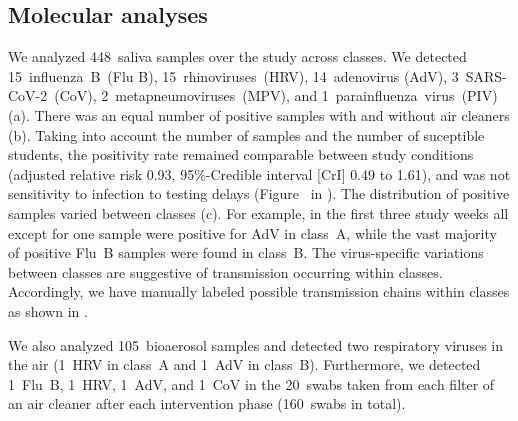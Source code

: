 \documentclass[fleqn,11pt]{wlscirep}
\begin{document}
\subsection{Molecular analyses}

We analyzed 448~saliva samples over the study across classes. We detected 15~influenza~B~(Flu B), 15~rhinoviruses~(HRV), 14~adenovirus (AdV), 3~SARS-CoV-2~(CoV), 2~metapneumoviruses~(MPV), and 1~parainfluenza~virus~(PIV) (a). There was an equal number of positive samples with and without air cleaners (b). Taking into account the number of samples and the number of suceptible students, the positivity rate remained comparable between study conditions (adjusted relative risk 0.93, 95\%-Credible interval [CrI] 0.49 to 1.61), and was not sensitivity to infection to testing delays (Figure~ in \supp). The distribution of positive samples varied between classes (c). For example, in the first three study weeks all except for one sample were positive for AdV in class~A, while the vast majority of positive Flu~B samples were found in class~B. The virus-specific variations between classes are suggestive of transmission occurring within classes. Accordingly, we have manually labeled possible transmission chains within classes as shown in .

We also analyzed 105~bioaerosol samples and detected  two respiratory viruses in the air (1~HRV in class~A and 1~AdV in class~B). Furthermore, we detected 1~Flu~B, 1~HRV, 1~AdV, and 1~CoV in the 20~swabs taken from each filter of an air cleaner after each intervention phase (160~swabs in total).
\end{document}
